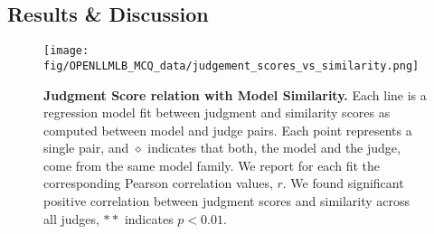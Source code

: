 \subsection{Results \& Discussion}

\begin{figure}
    \centering
    \texttt{[image: fig/OPENLLMLB\_MCQ\_data/judgement\_scores\_vs\_similarity.png]}
    \caption{\textbf{Judgment Score relation with Model Similarity.} Each line is a regression model fit between judgment and similarity scores as computed between model and judge pairs. Each point represents a single pair, and $\diamond$ indicates that both, the model and the judge, come from the same model family. We report for each fit the corresponding Pearson correlation values, $r$. We found significant positive correlation between judgment scores and similarity across all judges, $**$ indicates $p<0.01$.}
    \label{fig:judge-sim-plot}
    \vspace{-0.3cm}
\end{figure}
